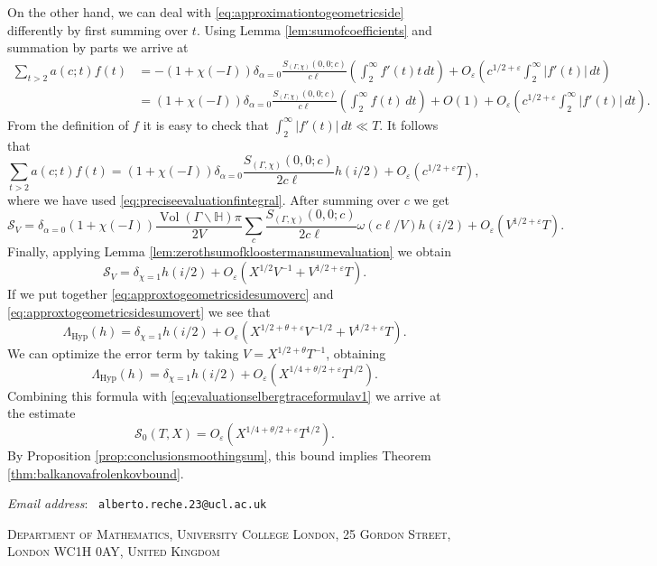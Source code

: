 \documentclass{article}
\theoremstyle{named}
\renewcommand{\S}{\mathcal{S}}
\newcommand{\Hyp}{\mathbb{H}}
\DeclareMathOperator{\vol}{Vol}
\begin{document}
On the other hand, we can deal with \eqref{eq:approximationtogeometricside} differently by first summing over $t$. Using Lemma \ref{lem:sumofcoefficients} and summation by parts we arrive at 
\begin{equation*}
\begin{aligned}
    \sum_{t > 2}a(c; t)f(t) & = -(1 + \chi(-I))\delta_{\alpha = 0}\frac{S_{(\Gamma, \chi)}(0, 0; c)}{c \ell}\left(\int_2^\infty f'(t) t\, dt\right) + O_\varepsilon\left(c^{1/2 + \varepsilon} \int_2^\infty |f'(t)|\, dt\right)\\
    & = (1 + \chi(-I))\delta_{\alpha = 0}\frac{S_{(\Gamma, \chi)}(0, 0; c)}{c \ell}\left(\int_2^\infty f(t)\, dt\right) + O(1) +  O_\varepsilon\left(c^{1/2 + \varepsilon} \int_2^\infty |f'(t)|\, dt\right).
\end{aligned}
\end{equation*}
From the definition of $f$ it is easy to check that $\int_2^\infty |f'(t)|\, dt \ll T$. It follows that
\begin{equation*}
    \sum_{t > 2}a(c; t)f(t) = (1 + \chi(-I))\delta_{\alpha = 0}\frac{S_{(\Gamma, \chi)}(0, 0; c)}{2c \ell} h(i/2) + O_\varepsilon(c^{1/2 + \varepsilon}T),
\end{equation*}
where we have used \eqref{eq:preciseevaluationfintegral}. After summing over $c$ we get
\begin{equation}\label{eq:intermediateapproxtoSv}
    \S_V = \delta_{\alpha = 0}(1 + \chi(-I))\frac{\vol(\Gamma\backslash \Hyp)\pi}{2V}\sum_c \frac{S_{(\Gamma, \chi)}(0, 0; c)}{2c \ell}\omega(c \ell/V) h(i/2)+ O_\varepsilon(V^{1/2 + \varepsilon} T).
\end{equation}
Finally, applying Lemma \ref{lem:zerothsumofkloostermansumevaluation} we obtain
\begin{equation}\label{eq:approxtogeometricsidesumovert}
    \S_V = \delta_{\chi = 1}h(i/2) + O_\varepsilon(X^{1/2}V^{-1} + V^{1/2 + \varepsilon}T).
\end{equation}
If we put together \eqref{eq:approxtogeometricsidesumoverc} and \eqref{eq:approxtogeometricsidesumovert} we see that
\begin{equation*}
    \Lambda_{\text{Hyp}}(h) = \delta_{\chi = 1} h(i/2) + O_\varepsilon(X^{1/2 + \theta + \varepsilon}V^{-1/2} + V^{1/2 + \varepsilon}T).
\end{equation*}
We can optimize the error term by taking $V = X^{1/2 + \theta}T^{-1}$, obtaining
\begin{equation*}
    \Lambda_{\text{Hyp}}(h) = \delta_{\chi = 1} h(i/2) + O_\varepsilon(X^{1/4 + \theta/2+ \varepsilon}T^{1/2}).
\end{equation*}
Combining this formula with \eqref{eq:evaluationselbergtraceformulav1} we arrive at the estimate
\begin{equation*}
    \S_0(T, X) =  O_\varepsilon(X^{1/4 + \theta/2+ \varepsilon}T^{1/2}).
\end{equation*}
By Proposition \ref{prop:conclusionsmoothingsum}, this bound implies Theorem \ref{thm:balkanovafrolenkovbound}.




\printbibliography

\footnotesize
\textit{Email address}: \, \texttt{alberto.reche.23@ucl.ac.uk}\par\nopagebreak
\textsc{Department of Mathematics, University College London, 25 Gordon Street, London WC1H 0AY, United Kingdom}
  
\end{document}
